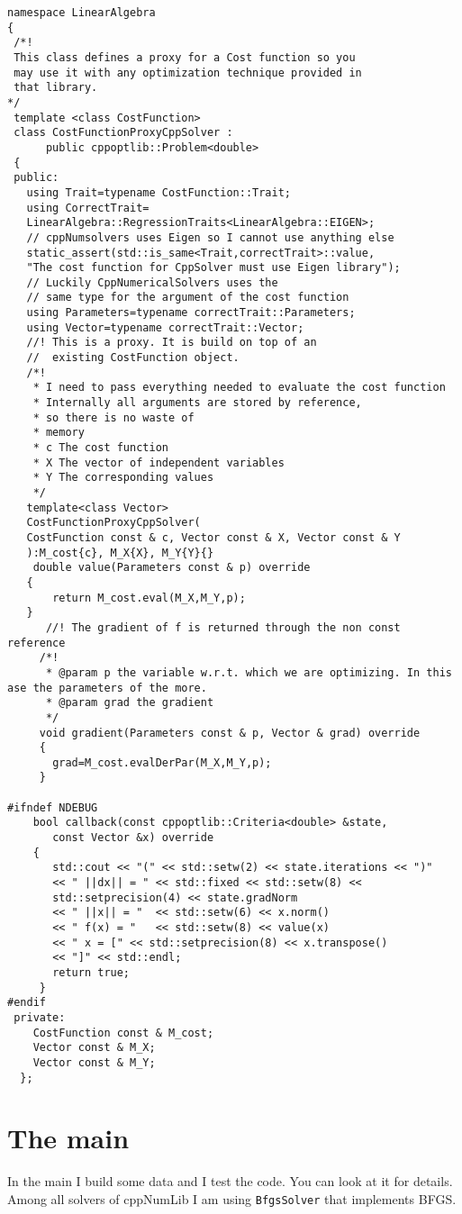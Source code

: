 \documentclass{article}
\newcommand{\li}{\lstinline}
\begin{document}
\begin{lstlisting}[title={CostFunctionProxyCppNumSolver.hpp}]
namespace LinearAlgebra
{
 /*!
 This class defines a proxy for a Cost function so you
 may use it with any optimization technique provided in
 that library.
*/
 template <class CostFunction>
 class CostFunctionProxyCppSolver :
      public cppoptlib::Problem<double>
 {
 public:
   using Trait=typename CostFunction::Trait;
   using CorrectTrait=
   LinearAlgebra::RegressionTraits<LinearAlgebra::EIGEN>;
   // cppNumsolvers uses Eigen so I cannot use anything else
   static_assert(std::is_same<Trait,correctTrait>::value,
   "The cost function for CppSolver must use Eigen library");
   // Luckily CppNumericalSolvers uses the
   // same type for the argument of the cost function
   using Parameters=typename correctTrait::Parameters;
   using Vector=typename correctTrait::Vector;
   //! This is a proxy. It is build on top of an
   //  existing CostFunction object.
   /*!
    * I need to pass everything needed to evaluate the cost function
    * Internally all arguments are stored by reference,
    * so there is no waste of
    * memory
    * c The cost function
    * X The vector of independent variables
    * Y The corresponding values
    */
   template<class Vector>
   CostFunctionProxyCppSolver(
   CostFunction const & c, Vector const & X, Vector const & Y
   ):M_cost{c}, M_X{X}, M_Y{Y}{}
    double value(Parameters const & p) override
   {
       return M_cost.eval(M_X,M_Y,p);
   }
      //! The gradient of f is returned through the non const reference
     /*!
      * @param p the variable w.r.t. which we are optimizing. In this ase the parameters of the more.
      * @param grad the gradient
      */
     void gradient(Parameters const & p, Vector & grad) override
     {
       grad=M_cost.evalDerPar(M_X,M_Y,p);
     }
     
#ifndef NDEBUG
    bool callback(const cppoptlib::Criteria<double> &state,
       const Vector &x) override
    {
       std::cout << "(" << std::setw(2) << state.iterations << ")"
       << " ||dx|| = " << std::fixed << std::setw(8) <<
       std::setprecision(4) << state.gradNorm
       << " ||x|| = "  << std::setw(6) << x.norm()
       << " f(x) = "   << std::setw(8) << value(x)
       << " x = [" << std::setprecision(8) << x.transpose()
       << "]" << std::endl;
       return true;
     }
#endif
 private:
    CostFunction const & M_cost;
    Vector const & M_X;
    Vector const & M_Y;
  };
\end{lstlisting}
\section{The main}
In the main I build some data and I test the code. You can look at it
for details. Among all solvers of cppNumLib I am using
\li!BfgsSolver! that implements BFGS.
\end{document}
